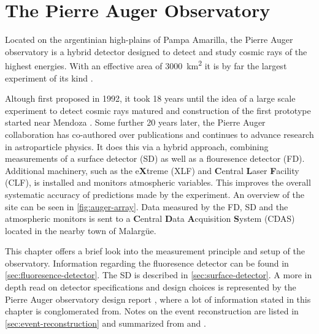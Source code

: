 
\chapter{The Pierre Auger Observatory}
\label{chap:auger-observatory}

Located on the argentinian high-plains of Pampa Amarilla, the Pierre Auger observatory is a hybrid detector designed to detect and study cosmic 
rays of the highest energies. With an effective area of \SI{3000}{\kilo\meter\squared} it is by far the largest experiment of its kind 
\cite{DesignReport}.

Altough first proposed in 1992, it took 18 years until the idea of a large scale experiment to detect cosmic rays matured and construction of the 
first prototype started near Mendoza \cite{AugerTimeline}. Some further 20 years later, the Pierre Auger collaboration has co-authored over \TODO
publications and continues to advance research in astroparticle physics.
It does this via a hybrid approach, combining measurements of a surface detector (SD) as well as a flouresence detector (FD). Additional machinery, 
such as the e\textbf{X}treme (XLF) and \textbf{C}entral \textbf{L}aser \textbf{F}acility (CLF), is installed and monitors atmospheric variables. This
improves the overall systematic accuracy of predictions made by the experiment. An overview of the site can be seen in \autoref{fig:auger-array}. Data 
measured by the FD, SD and the atmospheric monitors is sent to a \textbf{C}entral \textbf{D}ata \textbf{A}cquisition \textbf{S}ystem (CDAS) located in 
the nearby town of Malargüe.

This chapter offers a brief look into the measurement principle and setup of the observatory. Information regarding the fluoresence detector can be 
found in \autoref{sec:fluoresence-detector}. The SD is described in \autoref{sec:surface-detector}. A more in depth read on detector specifications 
and design choices is represented by the Pierre Auger observatory design report \cite{DesignReport}, where a lot of information stated in this chapter
is conglomerated from. Notes on the event reconstruction are listed in \autoref{sec:event-reconstruction} and summarized from \cite{SDReconstruction} 
and \cite{FDReconstruction}.

